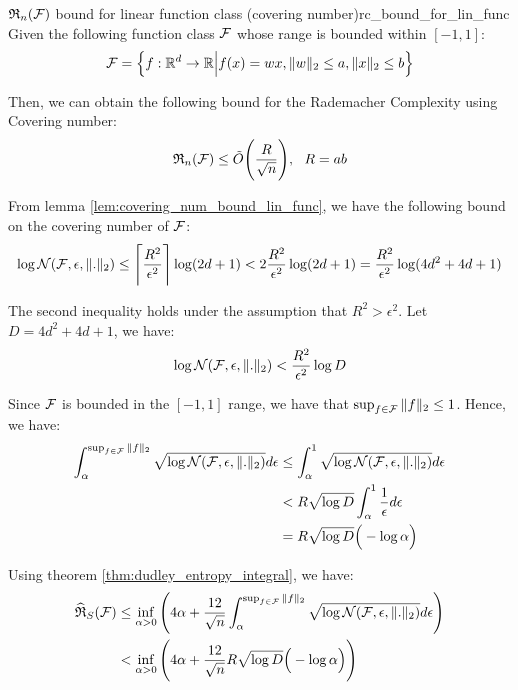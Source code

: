 \begin{proposition}{$\mathfrak{R}_n(\mathcal{F})$ bound for linear function class (covering number)}{rc_bound_for_lin_func}
    Given the following function class $\mathcal{F}$ whose range is bounded within $[-1, 1]$:
    \begin{align*}
        \mathcal{F} = \Big\{ 
            f:\mathbb{R}^d\to\mathbb{R} \Big| f(x) = wx, \|w\|_2 \le a, \|x\|_2 \le b
         \Big\}
    \end{align*}

    \noindent Then, we can obtain the following bound for the Rademacher Complexity using Covering number:
    \begin{align*}
        \mathfrak{R}_n(\mathcal{F}) \le \tilde O \Bigg( \frac{R}{\sqrt{n}} \Bigg), \ \ R = ab
    \end{align*}
\end{proposition}
\begin{proof*}
    \noindent From lemma \ref{lem:covering_num_bound_lin_func}, we have the following bound on the covering number of $\mathcal{F}$:
    \begin{align*}
        \log\mathcal{N}(\mathcal{F}, \epsilon, \|.\|_2) \le \Bigg\lceil \frac{R^2}{\epsilon^2} \Bigg\rceil \log(2d+1) < 2\frac{R^2}{\epsilon^2}\log(2d+1) = \frac{R^2}{\epsilon^2}\log(4d^2 + 4d + 1)
    \end{align*}

    \noindent The second inequality holds under the assumption that $R^2 > \epsilon^2$. Let $D = 4d^2 + 4d + 1$, we have:
    \begin{align*}
        \log\mathcal{N}(\mathcal{F}, \epsilon, \|.\|_2) < \frac{R^2}{\epsilon^2} \log D
    \end{align*}

    \noindent Since $\mathcal{F}$ is bounded in the $[-1, 1]$ range, we have that $\sup_{f\in\mathcal{F}}\|f\|_2 \le 1$. Hence, we have:
    \begin{align*}
        \int_\alpha^{\sup_{f\in\mathcal{F}}\|f\|_2} \sqrt{\log\mathcal{N}(\mathcal{F}, \epsilon, \|.\|_2)} d\epsilon
            &\le \int_\alpha^1 \sqrt{\log\mathcal{N}(\mathcal{F}, \epsilon, \|.\|_2)} d\epsilon \\
            &< R\sqrt{\log D}\int_\alpha^1 \frac{1}{\epsilon}d\epsilon \\
            &= R\sqrt{\log D}\Big(  - \log\alpha  \Big)
    \end{align*}

    \noindent Using theorem \ref{thm:dudley_entropy_integral}, we have:
    \begin{align*}
        \widehat{\mathfrak{R}}_S(\mathcal{F}) 
            &\le \inf_{\alpha>0}\Bigg( 
                4\alpha + \frac{12}{\sqrt n} \int_\alpha^{\sup_{f\in\mathcal{F}}\|f\|_2} \sqrt{\log\mathcal{N}(\mathcal{F}, \epsilon, \|.\|_2)} d\epsilon
             \Bigg) \\
            &< \inf_{\alpha>0}\Bigg( 
                4\alpha + \frac{12}{\sqrt n} R\sqrt{\log D} \Big(  - \log\alpha  \Big)
             \Bigg)
    \end{align*}


\end{proof*}

